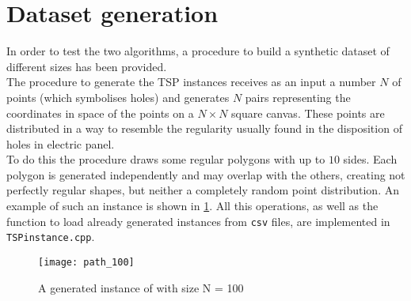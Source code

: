 \section{Dataset generation}
\label{sec:datasetgen}
In order to test the two algorithms, a procedure to build a synthetic dataset of different sizes has been provided.\\ 
The procedure to generate the TSP instances receives as an input a number $N$ of points (which symbolises holes) and generates $N$ pairs representing the coordinates in space of the points on a $N\times N$ square canvas. These points are distributed in a way to resemble the regularity usually found in the disposition of holes in electric panel.\\ 
To do this the procedure draws some regular polygons with up to $10$ sides. Each polygon is generated independently and may overlap with the others, creating not perfectly regular shapes, but neither a completely random point distribution. An example of such an instance is shown in \cref{fig:dataexample}. All this operations, as well as the function to load already generated instances from \texttt{csv} files, are implemented in \texttt{TSPinstance.cpp}.

\begin{figure}[h]
	\centering
	\texttt{[image: path\_100]}
	\caption{A generated instance of with size N = 100}
	\label{fig:dataexample}
\end{figure}


